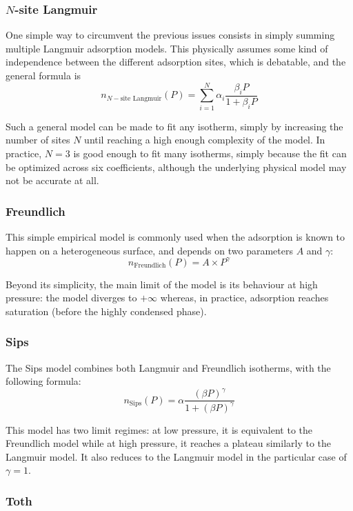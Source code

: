 \documentclass[main.tex]{subfiles}
\begin{document}
\subsubsection{$N$-site Langmuir}

One simple way to circumvent the previous issues consists in simply summing multiple Langmuir adsorption models. This physically assumes some kind of independence between the different adsorption sites, which is debatable, and the general formula is
\[n_{N-\text{site Langmuir}}(P) = \sum_{i=1}^N \alpha_i\frac{\beta_i P}{1+\beta_i P}\]

Such a general model can be made to fit any isotherm, simply by increasing the number of sites $N$ until reaching a high enough complexity of the model. In practice, $N=3$ is good enough to fit many isotherms, simply because the fit can be optimized across six coefficients, although the underlying physical model may not be accurate at all.

\subsubsection{Freundlich}

This simple empirical model is commonly used when the adsorption is known to happen on a heterogeneous surface, and depends on two parameters $A$ and $\gamma$:
\[n_\text{Freundlich}(P) = A\times P^\gamma\]

Beyond its simplicity, the main limit of the model is its behaviour at high pressure: the model diverges to $+\infty$ whereas, in practice, adsorption reaches saturation (before the highly condensed phase).

\subsubsection{Sips}

The Sips model combines both Langmuir and Freundlich isotherms, with the following formula:
\[n_\text{Sips}(P) = \alpha\frac{(\beta P)^\gamma}{1+(\beta P)^\gamma}\]

This model has two limit regimes: at low pressure, it is equivalent to the Freundlich model while at high pressure, it reaches a plateau similarly to the Langmuir model. It also reduces to the Langmuir model in the particular case of $\gamma = 1$.

\subsubsection{Toth}
\end{document}
